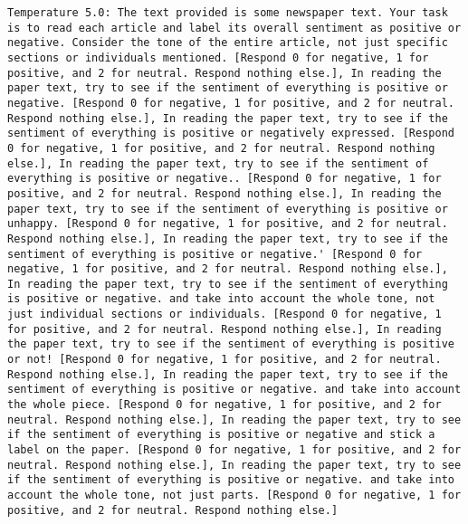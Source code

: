 \begin{lstlisting}[label=lst:poor_performing_prompts]
	Temperature 5.0: The text provided is some newspaper text. Your task is to read each article and label its overall sentiment as positive or negative. Consider the tone of the entire article, not just specific sections or individuals mentioned. [Respond 0 for negative, 1 for positive, and 2 for neutral. Respond nothing else.], In reading the paper text, try to see if the sentiment of everything is positive or negative. [Respond 0 for negative, 1 for positive, and 2 for neutral. Respond nothing else.], In reading the paper text, try to see if the sentiment of everything is positive or negatively expressed. [Respond 0 for negative, 1 for positive, and 2 for neutral. Respond nothing else.], In reading the paper text, try to see if the sentiment of everything is positive or negative.. [Respond 0 for negative, 1 for positive, and 2 for neutral. Respond nothing else.], In reading the paper text, try to see if the sentiment of everything is positive or unhappy. [Respond 0 for negative, 1 for positive, and 2 for neutral. Respond nothing else.], In reading the paper text, try to see if the sentiment of everything is positive or negative.' [Respond 0 for negative, 1 for positive, and 2 for neutral. Respond nothing else.], In reading the paper text, try to see if the sentiment of everything is positive or negative. and take into account the whole tone, not just individual sections or individuals. [Respond 0 for negative, 1 for positive, and 2 for neutral. Respond nothing else.], In reading the paper text, try to see if the sentiment of everything is positive or not! [Respond 0 for negative, 1 for positive, and 2 for neutral. Respond nothing else.], In reading the paper text, try to see if the sentiment of everything is positive or negative. and take into account the whole piece. [Respond 0 for negative, 1 for positive, and 2 for neutral. Respond nothing else.], In reading the paper text, try to see if the sentiment of everything is positive or negative and stick a label on the paper. [Respond 0 for negative, 1 for positive, and 2 for neutral. Respond nothing else.], In reading the paper text, try to see if the sentiment of everything is positive or negative. and take into account the whole tone, not just parts. [Respond 0 for negative, 1 for positive, and 2 for neutral. Respond nothing else.]


\end{lstlisting}

